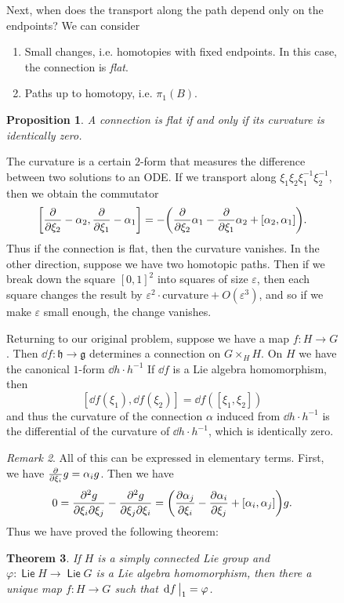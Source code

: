 \documentclass[leqno, openany]{memoir}
\newtheorem{thm}{Theorem}[section]
\newtheorem{prop}[thm]{Proposition}
\theoremstyle{definition}
\theoremstyle{remark}
\newtheorem{rmk}[thm]{Remark}
\theoremstyle{plain}
\theoremstyle{definition}
\theoremstyle{remark}
\newcommand{\ep}{\varepsilon}
\newcommand{\mf}[1]{\mathfrak{#1}}
\DeclareMathOperator{\Lie}{\mathsf{Lie}}
\begin{document}
\begin{figure}[H]
Next, when does the transport along the path depend only on the endpoints? We
can consider \begin{enumerate} \item Small changes, i.e. homotopies with fixed
    endpoints. In this case, the connection is \textit{flat}.  \item Paths up
    to homotopy, i.e. $\pi_1(B)$.  \end{enumerate}

\begin{prop} A connection is flat if and only if its curvature is identically
zero.  \end{prop}

The curvature is a certain $2$-form that measures the difference between two
solutions to an ODE. If we transport along $\xi_1 \xi_2 \xi_1^{-1} \xi_2^{-1}$,
then we obtain the commutator \[ \qty[ \pdv{\xi_2} - \alpha_2, \pdv{\xi_1} -
\alpha_1 ] = - \qty( \pdv{\xi_2} \alpha_1 - \pdv{\xi_1} \alpha_2 + [\alpha_2,
\alpha_1] ). \] Thus if the connection is flat, then the curvature vanishes. In
the other direction, suppose we have two homotopic paths. Then if we break down
the square $[0,1]^2$ into squares of size $\ep$, then each square changes the
result by $\ep^2 \cdot \text{curvature} + O(\ep^3)$, and so if we make $\ep$
small enough, the change vanishes.

Returning to our original problem, suppose we have a map $f \colon H \to G$.
Then $\dd{f} \colon \mf{h} \to \mf{g}$ determines a connection on $G \times_H
H$. On $H$ we have the canonical $1$-form $\dd{h} \cdot h^{-1}$ If $\dd{f}$ is
a Lie algebra homomorphism, then \[ [\dd{f}(\xi_1), \dd{f}(\xi_2)] = \dd{f} (
[\xi_1, \xi_2] ) \] and thus the curvature of the connection $\alpha$ induced
from $\dd{h} \cdot h^{-1}$ is the differential of the curvature of $\dd{h}
\cdot h^{-1}$, which is identically zero.

\begin{rmk} All of this can be expressed in elementary terms. First, we have
    $\pdv{\xi_i} g = \alpha_i g$. Then we have \[ 0 = \pdv{g}{\xi_i}{\xi_j} -
    \pdv{g}{\xi_j}{\xi_i} = \qty( \pdv{\alpha_j}{\xi_i} - \pdv{\alpha_i}{\xi_j}
+ [\alpha_i, \alpha_j] ) g. \] Thus we have proved the following theorem:
\end{rmk}

\begin{thm} If $H$ is a simply connected Lie group and $\varphi \colon \Lie H
\to \Lie G$ is a Lie algebra homomorphism, then there a unique map $f \colon H
\to G$ such that $\eval{\dd{f}}_1 = \varphi$.  \end{thm}


\end{figure}
\end{document}
